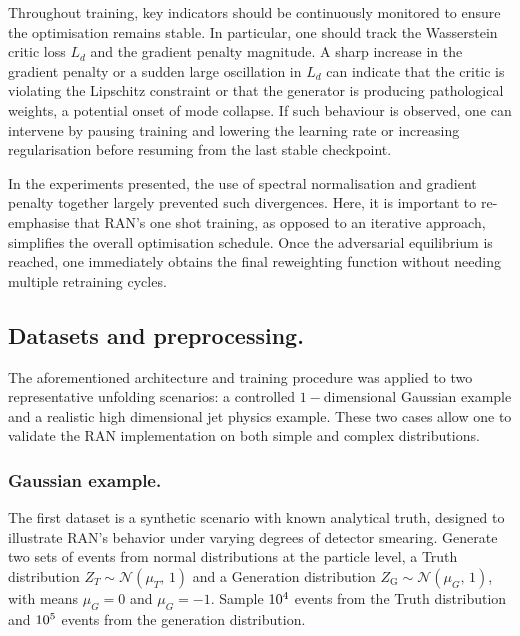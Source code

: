 {{        Throughout training, key indicators should be continuously monitored to ensure the optimisation remains stable.
        In particular, one should track the Wasserstein critic loss $L_d$ and the gradient penalty magnitude.
        A sharp increase in the gradient penalty or a sudden large oscillation in $L_d$ can indicate that the critic is violating the Lipschitz constraint or that the generator is producing pathological weights, a potential onset of mode collapse.
        If such behaviour is observed, one can intervene by pausing training and lowering the learning rate or increasing regularisation before resuming from the last stable checkpoint.
        
        In the experiments presented, the use of spectral normalisation and gradient penalty together largely prevented such divergences.
        Here, it is important to re-emphasise that RAN’s one shot training, as opposed to an iterative approach, simplifies the overall optimisation schedule.
        Once the adversarial equilibrium is reached, one immediately obtains the final reweighting function without needing multiple retraining cycles.
    
    \subsection{Datasets and preprocessing.}
        The aforementioned architecture and training procedure was applied to two representative unfolding scenarios: a controlled \(1-\)dimensional Gaussian example and a realistic high dimensional jet physics example.
        These two cases allow one to validate the RAN implementation on both simple and complex distributions.

        \subsubsection{Gaussian example.}
            The first dataset is a synthetic scenario with known analytical truth, designed to illustrate RAN’s behavior under varying degrees of detector smearing.
            Generate two sets of events from normal distributions at the particle level, a Truth distribution $Z_{T} \sim \mathcal{N}(\mu_{T},\,1)$ and a Generation distribution $Z_{\text{G}} \sim \mathcal{N}(\mu_{G},\,1)$, with means $\mu_{G}=0$ and $\mu_{G}=-1$.
            Sample \(\num{d4}\) events from the Truth distribution and \(\num{d5}\) events from the generation distribution.
            
}}

